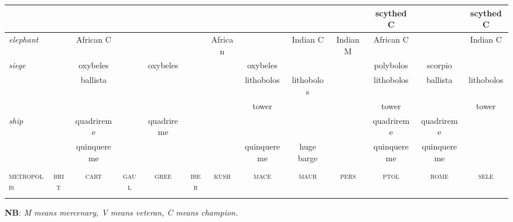 \documentclass{article}
\newcommand{\brit}{\textsc{\color{blue} brit}}
\newcommand{\cart}{\textsc{\color{blue} cart}}
\newcommand{\gaul}{\textsc{\color{blue} gaul}}
\newcommand{\gree}{\textsc{\color{blue} gree}}
\newcommand{\iber}{\textsc{\color{blue} iber}}
\newcommand{\kush}{\textsc{\color{blue} kush}}
\newcommand{\mace}{\textsc{\color{blue} mace}}
\newcommand{\maur}{\textsc{\color{blue} maur}}
\newcommand{\pers}{\textsc{\color{blue} pers}}
\newcommand{\ptol}{\textsc{\color{blue} ptol}}
\newcommand{\rome}{\textsc{\color{blue} rome}}
\newcommand{\sele}{\textsc{\color{blue} sele}}
\newcommand{\metropolis}{\textsc{\color{blue} metropolis}}
\begin{document}
\begin{landscape}
\begin{tabular}{l||c|c|c|c||c|c|c|c||c|c|c|c}
 &                &                &                &                &                &                &                &                &                & scythed C      &                & scythed C      \\
\hline\textit{elephant}
 &                & African C      &                &                &                & African        &                & Indian C       & Indian M       & African C      &                & Indian C       \\
\hline\textit{siege}
 &                & oxybeles       &                & oxybeles       &                &                & oxybeles       &                &                & polybolos      & scorpio        &                \\
 &                & ballista       &                &                &                &                & lithobolos     & lithobolos     &                & lithobolos     & ballista       & lithobolos     \\
 &                &                &                &                &                &                & tower          &                &                & tower          &                & tower          \\
\hline\textit{ship}
 &                & quadrireme     &                & quadrireme     &                &                &                &                &                & quadrireme     & quadrireme     &                \\
 &                & quinquereme    &                &                &                &                & quinquereme    & huge barge     &                & quinquereme    & quinquereme    &                \\

\hline
\hline
 &                &                &                &                &                &                &                &                &                &                &                &                \\
\metropolis %
 & \brit          & \cart          & \gaul          & \gree          & \iber          & \kush          & \mace          & \maur          & \pers          & \ptol          & \rome          & \sele          \\
 &                &                &                &                &                &                &                &                &                &                &                &                \\
\hline
\hline
\end{tabular}

\textbf{NB}: \emph{\emph{M} means mercenary, \emph{V} means veteran, \emph{C} means champion.}
\end{landscape}
\end{document}
